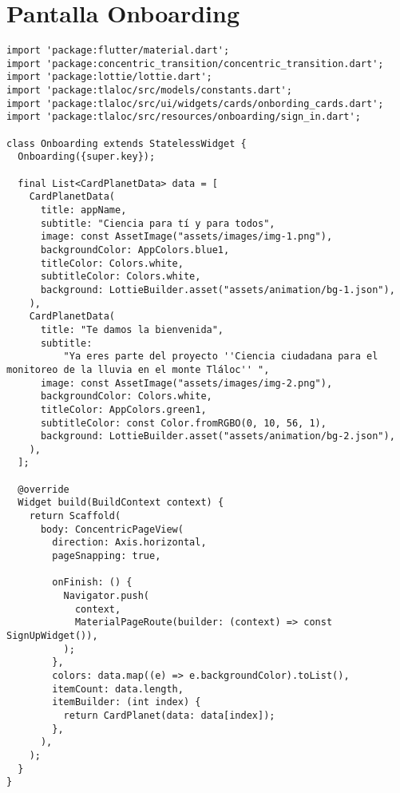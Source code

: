 \section{Pantalla Onboarding}
\label{anexo:alg6}
\begin{verbatim}
import 'package:flutter/material.dart';
import 'package:concentric_transition/concentric_transition.dart';
import 'package:lottie/lottie.dart';
import 'package:tlaloc/src/models/constants.dart';
import 'package:tlaloc/src/ui/widgets/cards/onbording_cards.dart';
import 'package:tlaloc/src/resources/onboarding/sign_in.dart';

class Onboarding extends StatelessWidget {
  Onboarding({super.key});

  final List<CardPlanetData> data = [
    CardPlanetData(
      title: appName,
      subtitle: "Ciencia para tí y para todos",
      image: const AssetImage("assets/images/img-1.png"),
      backgroundColor: AppColors.blue1,
      titleColor: Colors.white,
      subtitleColor: Colors.white,
      background: LottieBuilder.asset("assets/animation/bg-1.json"),
    ),
    CardPlanetData(
      title: "Te damos la bienvenida",
      subtitle:
          "Ya eres parte del proyecto ''Ciencia ciudadana para el monitoreo de la lluvia en el monte Tláloc'' ",
      image: const AssetImage("assets/images/img-2.png"),
      backgroundColor: Colors.white,
      titleColor: AppColors.green1,
      subtitleColor: const Color.fromRGBO(0, 10, 56, 1),
      background: LottieBuilder.asset("assets/animation/bg-2.json"),
    ),
  ];

  @override
  Widget build(BuildContext context) {
    return Scaffold(
      body: ConcentricPageView(
        direction: Axis.horizontal,
        pageSnapping: true,

        onFinish: () {
          Navigator.push(
            context,
            MaterialPageRoute(builder: (context) => const SignUpWidget()),
          );
        },
        colors: data.map((e) => e.backgroundColor).toList(),
        itemCount: data.length,
        itemBuilder: (int index) {
          return CardPlanet(data: data[index]);
        },
      ),
    );
  }
}

\end{verbatim}






\newpage
